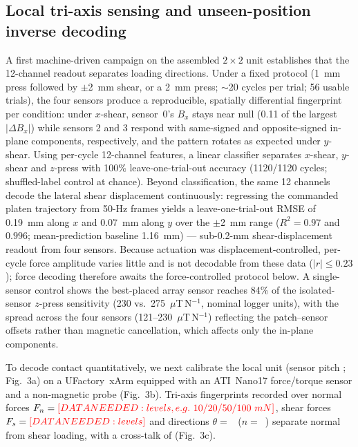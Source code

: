 \subsection*{Local tri-axis sensing and unseen-position inverse decoding}
A first machine-driven campaign on the assembled $2\times2$ unit establishes
that the 12-channel readout separates loading directions. Under a fixed
protocol (1~mm press followed by $\pm$2~mm shear, or a 2~mm press; $\sim$20
cycles per trial; 56 usable trials), the four sensors produce a reproducible,
spatially differential fingerprint per condition: under $x$-shear, sensor~0's
$B_x$ stays near null (0.11 of the largest $|\Delta B_x|$) while sensors
2 and 3 respond with same-signed and opposite-signed in-plane components,
respectively, and the pattern rotates as expected under $y$-shear. Using
per-cycle 12-channel features, a linear classifier separates $x$-shear,
$y$-shear and $z$-press with 100\% leave-one-trial-out accuracy (1120/1120
cycles; shuffled-label control at chance). Beyond classification, the same 12 channels decode the lateral shear
displacement continuously: regressing the commanded platen trajectory from
50-Hz frames yields a leave-one-trial-out RMSE of 0.19~mm along $x$ and
0.07~mm along $y$ over the $\pm$2~mm range ($R^2=0.97$ and $0.996$;
mean-prediction baseline 1.16~mm) --- sub-0.2-mm shear-displacement readout
from four sensors. Because actuation was displacement-controlled, per-cycle
force amplitude varies little and is not decodable from these data
($|r|\leq0.23$); force decoding therefore awaits the force-controlled
protocol below. A single-sensor control shows the
best-placed array sensor reaches 84\% of the isolated-sensor $z$-press
sensitivity (230 vs.\ 275~$\mu$T\,N$^{-1}$, nominal logger units), with the
spread across the four sensors (121--230~$\mu$T\,N$^{-1}$) reflecting the
patch--sensor offsets rather than magnetic cancellation, which affects only
the in-plane components.

To decode contact quantitatively, we next calibrate the local unit
(sensor pitch ; Fig.~3a) on a UFactory~xArm
equipped with an ATI~Nano17 force/torque sensor and a non-magnetic probe
(Fig.~3b). Tri-axis
fingerprints recorded over normal forces
$F_n=\dataneeded{levels, e.g.\ 10/20/50/100~mN}$, shear forces
$F_s=\textcolor{red}{[DATA NEEDED: levels]}$ and directions
$\theta=$~
($n=$~) separate normal from shear loading, with a
cross-talk of  (Fig.~3c).

